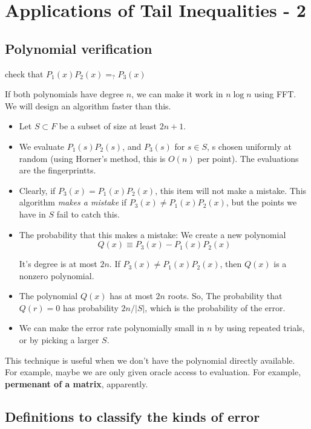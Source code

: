 \chapter{Applications of Tail Inequalities - 2}


\section{Polynomial verification}
check that $P_1(x) P_2(x) =_? P_3(x)$

If both polynomials have degree $n$, we can make it work in $n \log n$ using
FFT. We will design an algorithm faster than this.


\begin{itemize}
    \item Let $S \subset F$ be a subset of size at least $2n + 1$.
    \item We evaluate $P_1(s) P_2(s)$, and $P_3(s)$ for $s \in S$, s chosen uniformly
    at random (using Horner's method, this is $O(n)$ per point). The evaluations
    are the fingerprintts.
    
    \item Clearly, if $P_3(x) = P_1(x) P_2(x)$, this item will not make a
    mistake. This algorithm \textit{makes a mistake} if $P_3(x) \neq P_1(x) P_2(x)$, but the
    points we have in $S$ fail to catch this.
    \item The probability that this makes a mistake: We create a new polynomial
    $$Q(x) \equiv P_3(x) - P_1(x) P_2(x)$$
    
    It's degree is at most $2n$. If $P_3(x) \neq P_1(x) P_2(x)$, then $Q(x)$ is a
    nonzero polynomial.

    \item The polynomial $Q(x)$ has at most $2n$ roots. So, The probability
    that $Q(r) = 0$ has probability $2n/|S|$, which is the probability of the
    error.

    \item We can make the error rate polynomially small in $n$ by using
    repeated trials, or by picking a larger $S$.
\end{itemize}

This technique is useful when we don't have the polynomial directly available.
For example, maybe we are only given oracle access to evaluation. For example,
\textbf{permenant of a matrix}, apparently.


\section{Definitions to classify the kinds of error}

